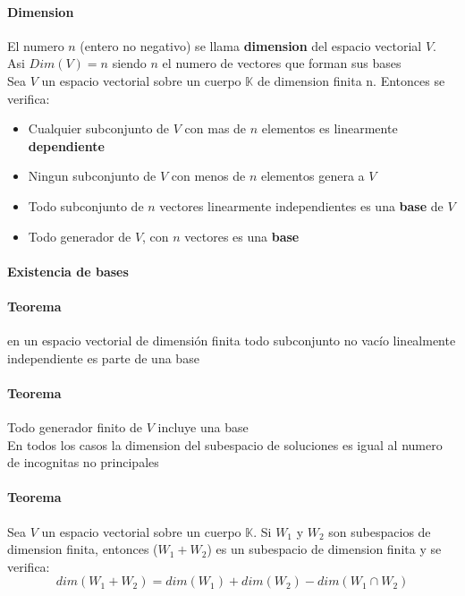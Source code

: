 \documentclass[10pt]{article}
\begin{document}
\paragraph{Dimension}
El numero $n$ (entero no negativo) se llama \textbf{dimension} del espacio vectorial $V$. Asi $Dim(V)=n$ siendo $n$ el numero de vectores que forman sus bases\\
\linebreak
Sea $V$ un espacio vectorial sobre un cuerpo $\mathbb{K}$ de dimension finita n. Entonces se verifica:
\begin{itemize}
	\item Cualquier subconjunto de $V$ con mas  de $n$ elementos es linearmente \textbf{dependiente}
	\item Ningun subconjunto de $V$ con menos de $n$ elementos genera a $V$
	\item Todo subconjunto de $n$ vectores linearmente independientes es una \textbf{base} de $V$
	\item Todo generador de $V$, con $n$ vectores es una \textbf{base}
\end{itemize}

\paragraph{Existencia de bases}

\paragraph{Teorema}
en un espacio vectorial de dimensión finita todo subconjunto no vacío linealmente independiente es parte de una base

\paragraph{Teorema}
Todo generador finito de $V$ incluye una base\\
\linebreak
En todos los casos la dimension del subespacio de soluciones  es igual al numero de incognitas no principales
\paragraph{Teorema}
Sea $V$ un espacio vectorial sobre un cuerpo $\mathbb{K}$. Si $W_1$ y $W_2$ son subespacios de dimension finita, entonces ($W_1+W_2$) es un subespacio de dimension finita y se verifica: 
\begin{equation*}
	dim(W_1+W_2) = dim(W_1) + dim(W_2) - dim(W_1 \cap W_2)
\end{equation*}
\end{document}
